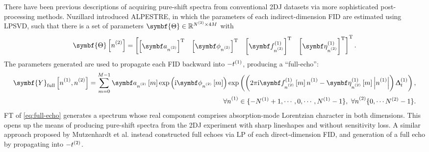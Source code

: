 There have been previous descriptions of acquiring pure-shift spectra from
conventional \ac{2DJ} datasets via more sophisticated post-processing methods.
Nuzillard introduced \ac{ALPESTRE}\cite{Nuzillard1996},  in which the parameters
of each indirect-dimension FID are estimated using \ac{LPSVD}, such that
there is a set of parameters $\symbf{\Theta} \in \mathbb{R}^{\Ntwo \times 4M}$
with
\begin{equation}
    \symbf{\Theta}\left[\ntwo\right] =
    \begin{bmatrix}
        \left[\bda_{\ntwo}\right]\T &
        \left[\bdphi_{\ntwo}\right]\T &
        \left[\bdfone_{\ntwo}\right]\T &
        \left[\bdetaone_{\ntwo}\right]\T
    \end{bmatrix}\T.
\end{equation}
The parameters generated are used to propagate each FID backward into
$-t^{(1)}$, producing a ``full-echo'':
\begin{equation}
    \begin{split}
        \symbf{Y}_{\text{full}}\left[\none, \ntwo\right] = \sum_{m=0}^{M-1}
            \bda_{\ntwo} \left[ m \right]
            \exp\left(\iu \bdphi_{\ntwo} \left[ m \right] \right)
            \exp\left(\left(2 \pi \iu \bdfone_{\ntwo} \left[ m \right] \none
            -\bdetaone_{\ntwo} \left[ m \right] \left\lvert \none \right\rvert \right)\Dtone\right), \\
        \forall \none \in \lbrace -\None + 1, \cdots, 0, \cdots, \None - 1 \rbrace,\ \forall \ntwo \lbrace 0, \cdots \Ntwo - 1 \rbrace.
    \end{split}
    \label{eq:full-echo}
\end{equation}
\ac{FT} of \eqref{eq:full-echo} generates a spectrum whose real component comprises absorption-mode
Lorentzian character in both dimensions. This opens up the means of producing
pure-shift spectra from the \ac{2DJ} experiment with sharp lineshapes and
without sensitivity loss. A similar approach proposed by Mutzenhardt et al.
instead constructed full echoes via \ac{LP} of each direct-dimension
\ac{FID}, and generation of a full echo by propagating
into $-t^{(2)}$\cite{Mutzenhardt1999}.

